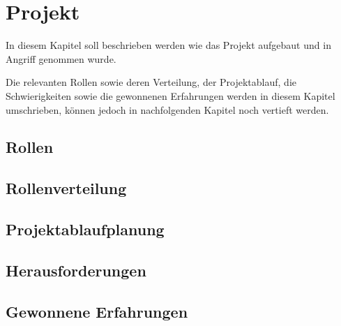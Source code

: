 \chapter{Projekt}

    In diesem Kapitel soll beschrieben werden wie das Projekt aufgebaut und in
    Angriff genommen wurde.

    Die relevanten Rollen sowie deren Verteilung, der Projektablauf, die
    Schwierigkeiten sowie die gewonnenen Erfahrungen werden in diesem Kapitel
    umschrieben, können jedoch in nachfolgenden Kapitel noch vertieft werden.

    \section{Rollen}

        \notAvailable{}

    \section{Rollenverteilung}

        \notAvailable{}

    \section{Projektablaufplanung}

        \notAvailable{}

    \section{Herausforderungen}

        \notAvailable{}

    \section{Gewonnene Erfahrungen}

        \notAvailable{}

